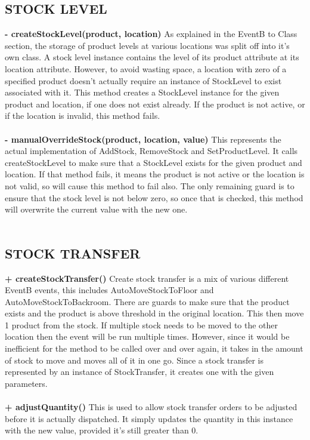 \documentclass[a4paper]{article}
\begin{document}
\subsection{STOCK LEVEL}
{\bf - createStockLevel(product, location)}
As explained in the EventB to Class section, the storage of product levels at various locations was split off into it’s own class. A stock level instance contains the level of its product attribute at its location attribute. However, to avoid wasting space, a location with zero of a specified product doesn’t actually require an instance of StockLevel to exist associated with it. This method creates a StockLevel instance for the given product and location, if one does not exist already. If the product is not active, or if the location is invalid, this method fails.
\\\\
{\bf - manualOverrideStock(product, location, value)}
This represents the actual implementation of AddStock, RemoveStock and SetProductLevel. It calls createStockLevel to make sure that a StockLevel exists for the given product and location. If that method fails, it means the product is not active or the location is not valid, so will cause this method to fail also. The only remaining guard is to ensure that the stock level is not below zero, so once that is checked, this method will overwrite the current value with the new one.
\\\\
\subsection{STOCK TRANSFER}
{\bf + createStockTransfer()}
Create stock transfer is a mix of various different EventB events, this includes AutoMoveStockToFloor and AutoMoveStockToBackroom. There are guards to make sure that the product exists and the product is above threshold in the original location. This then move 1 product from the stock. If multiple stock needs to be moved to the other location then the event will be run multiple times. However, since it would be inefficient for the method to be called over and over again, it takes in the amount of stock to move and moves all of it in one go. Since a stock transfer is represented by an instance of StockTransfer, it creates one with the given parameters.
\\\\
{\bf + adjustQuantity()}
This is used to allow stock transfer orders to be adjusted before it is actually dispatched. It simply updates the quantity in this instance with the new value, provided it’s still greater than 0.
\\\\
\end{document}
